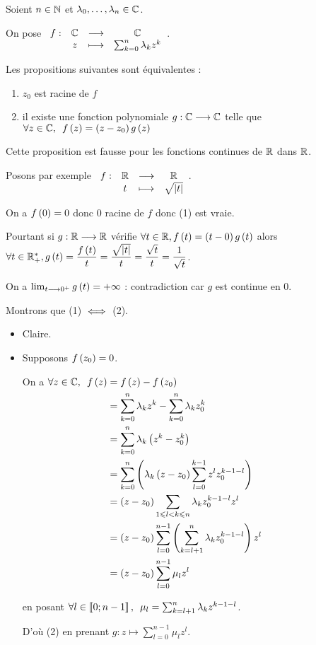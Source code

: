 \begin{prop}
Soient \(n\in\mathbb{N}\) et \(\lambda_0,\dots,\lambda_n\in\mathbb{C}\).

On pose \(\begin{array}[t]{cccc}f : & \mathbb{C} & \longrightarrow & \mathbb{C} \\ & z & \longmapsto & \sum_{k=0}^n\lambda_kz^k\end{array}\).

Les propositions suivantes sont équivalentes : \begin{enumerate}
\item \(z_0\) est racine de \(f\)

\item il existe une fonction polynomiale \(g:\mathbb{C}\longrightarrow\mathbb{C}\) telle que \(\quantifs{\forall z\in\C}f\paren{z}=\paren{z-z_0}g\paren{z}\)
\end{enumerate}
\end{prop}

\begin{rem}
Cette proposition est fausse pour les fonctions continues de \(\mathbb{R}\) dans \(\mathbb{R}\).

Posons par exemple \(\begin{array}[t]{cccc}f : & \mathbb{R} & \longrightarrow & \mathbb{R} \\ & t & \longmapsto & \sqrt{\left\lvert t\right\rvert}\end{array}\).

On a \(f\left(0\right)=0\) donc \(0\) racine de \(f\) donc (1) est vraie.

Pourtant si \(g:\mathbb{R}\longrightarrow\mathbb{R}\) vérifie \(\forall t\in\mathbb{R},f\left(t\right)=\left(t-0\right)g\left(t\right)\) alors \(\forall t\in\mathbb{R}_+^*,g\left(t\right)=\dfrac{f\left(t\right)}{t}=\dfrac{\sqrt{\left\lvert t\right\rvert}}{t}=\dfrac{\sqrt{t}}{t}=\dfrac{1}{\sqrt{t}}\).

On a \(\lim_{t\longrightarrow0^+}g\left(t\right)=+\infty\) : contradiction car \(g\) est continue en \(0\).
\end{rem}

\begin{dem}
Montrons que (1) \(\iff\) (2).

\begin{itemize}
\item[\imprec] Claire.

\item[\impdir] Supposons \(f\left(z_0\right)=0\).

On a \(\begin{aligned}[t]
\quantifs{\forall z\in\C}f\paren{z}&=f\paren{z}-f\paren{z_0} \\
&=\sum_{k=0}^n\lambda_kz^k-\sum_{k=0}^n\lambda_kz_0^k \\
&=\sum_{k=0}^n\lambda_k\paren{z^k-z_0^k} \\
&=\sum_{k=0}^n\paren{\lambda_k\paren{z-z_0}\sum_{l=0}^{k-1}z^lz_0^{k-1-l}} \\
&=\paren{z-z_0}\sum_{1\leq l<k\leq n}\lambda_kz_0^{k-1-l}z^l \\
&=\paren{z-z_0}\sum_{l=0}^{n-1}\paren{\sum_{k=l+1}^n\lambda_kz_0^{k-1-l}}z^l \\
&=\paren{z-z_0}\sum_{l=0}^{n-1}\mu_lz^l
\end{aligned}\)

en posant \(\quantifs{\forall l\in\interventierii{0}{n-1}}\mu_l=\sum_{k=l+1}^{n}\lambda_kz^{k-1-l}\).

D'où (2) en prenant \(g:z\mapsto\sum_{l=0}^{n-1}\mu_lz^l\).
\end{itemize}
\end{dem}

